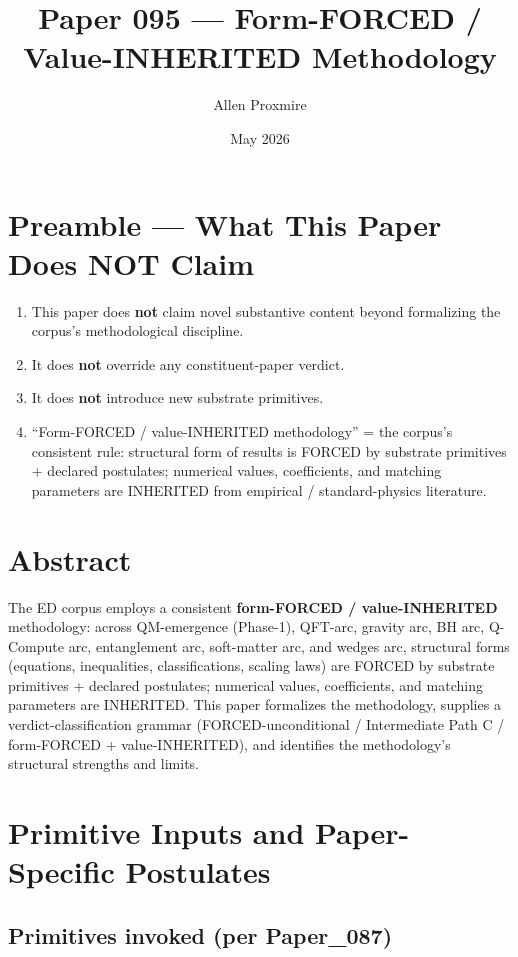 \documentclass[11pt,a4paper]{article}
\title{\vspace{-1cm}\Large\bfseries Paper 095 --- Form-FORCED / Value-INHERITED Methodology}
\author{Allen Proxmire}
\date{May 2026}
\begin{document}
\maketitle

\section*{Preamble --- What This Paper Does NOT Claim}

\begin{enumerate}[noitemsep]
\item This paper does \textbf{not} claim novel substantive content beyond formalizing the corpus's methodological discipline.
\item It does \textbf{not} override any constituent-paper verdict.
\item It does \textbf{not} introduce new substrate primitives.
\item ``Form-FORCED / value-INHERITED methodology'' = the corpus's consistent rule: structural form of results is FORCED by substrate primitives + declared postulates; numerical values, coefficients, and matching parameters are INHERITED from empirical / standard-physics literature.
\end{enumerate}

\section*{Abstract}

The ED corpus employs a consistent \textbf{form-FORCED / value-INHERITED} methodology: across QM-emergence (Phase-1), QFT-arc, gravity arc, BH arc, Q-Compute arc, entanglement arc, soft-matter arc, and wedges arc, structural forms (equations, inequalities, classifications, scaling laws) are FORCED by substrate primitives + declared postulates; numerical values, coefficients, and matching parameters are INHERITED. This paper formalizes the methodology, supplies a verdict-classification grammar (FORCED-unconditional / Intermediate Path C / form-FORCED + value-INHERITED), and identifies the methodology's structural strengths and limits.

\section{Primitive Inputs and Paper-Specific Postulates}

\subsection{Primitives invoked (per Paper\_087)}
\end{document}
